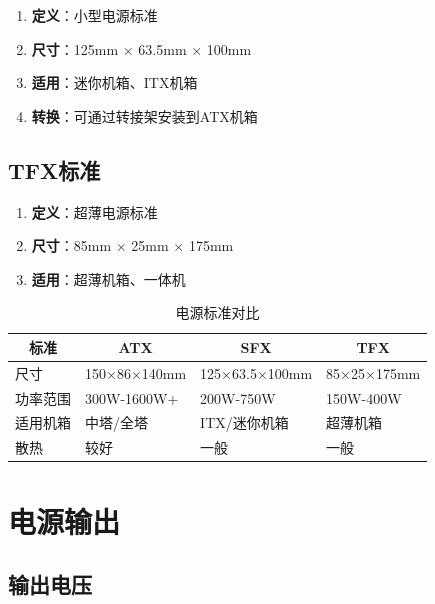 \documentclass[12pt,UTF8]{ctexbook}
\begin{document}
\begin{enumerate}
    \item \textbf{定义}：小型电源标准
    \item \textbf{尺寸}：125mm × 63.5mm × 100mm
    \item \textbf{适用}：迷你机箱、ITX机箱
    \item \textbf{转换}：可通过转接架安装到ATX机箱
\end{enumerate}

\section{TFX标准}

\begin{enumerate}
    \item \textbf{定义}：超薄电源标准
    \item \textbf{尺寸}：85mm × 25mm × 175mm
    \item \textbf{适用}：超薄机箱、一体机
\end{enumerate}

\begin{table}[H]
    \centering
    \begin{tabularx}{\textwidth}{|p{3cm}|X|X|X|}
        \hline
        \multicolumn{1}{|c|}{\textbf{标准}} & \multicolumn{1}{c|}{\textbf{ATX}} & \multicolumn{1}{c|}{\textbf{SFX}} & \multicolumn{1}{c|}{\textbf{TFX}} \\
        \hline
        尺寸 & 150×86×140mm & 125×63.5×100mm & 85×25×175mm \\
        \hline
        功率范围 & 300W-1600W+ & 200W-750W & 150W-400W \\
        \hline
        适用机箱 & 中塔/全塔 & ITX/迷你机箱 & 超薄机箱 \\
        \hline
        散热 & 较好 & 一般 & 一般 \\
        \hline
    \end{tabularx}
    \caption{电源标准对比}
    \label{tab:psu_standards}
\end{table}

\chapter{电源输出}

\section{输出电压}
\end{document}
